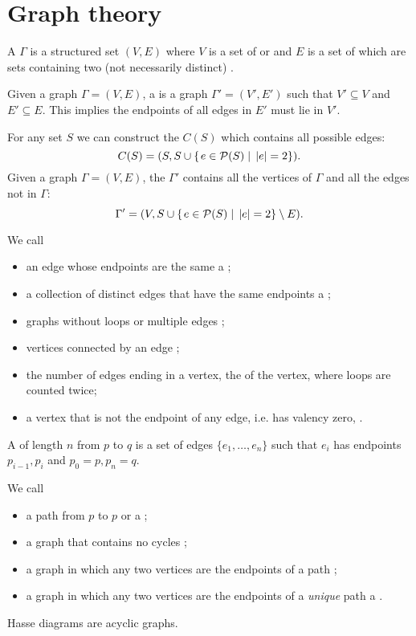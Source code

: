 \chapter{Graph theory}

\begin{definition}
A  $\Gamma$ is a structured set $(V,E)$ where $V$ is a set of  or  and $E$ is a set of  which are sets containing two (not necessarily distinct) .

Given a graph $\Gamma = (V,E)$, a  is a graph $\Gamma' = (V', E')$ such that $V'\subseteq V$ and $E'\subseteq E$. This implies the endpoints of all edges in $E'$ must lie in $V'$.

For any set $S$ we can construct the  $C(S)$ which contains all possible edges:
\[C(S) = (S, S\cup\left\{\left. e\in\mathcal{P}(S) \;\right|\; |e|=2 \right\}).\]
Given a graph $\Gamma = (V,E)$, the  $\Gamma'$ contains all the vertices of $\Gamma$ and all the edges not in $\Gamma$:
\[ \Gamma' = (V, S\cup\left\{\left. e\in\mathcal{P}(S) \;\right|\; |e|=2 \right\} \setminus E). \]

We call
\begin{itemize}
\item an edge whose endpoints are the same a ;
\item a collection of distinct edges that have the same endpoints a ;
\item graphs without loops or multiple edges ;
\item vertices connected by an edge ;
\item the number of edges ending in a vertex, the  of the vertex, where loops are counted twice;
\item a vertex that is not the endpoint of any edge, i.e. has valency zero, .
\end{itemize}

A  of length $n$ from  $p$ to $q$ is a set of edges $\{e_1, \ldots, e_n\}$ such that $e_i$ has endpoints $p_{i-1}, p_i$ and $p_0 =p, p_n = q$.

We call
\begin{itemize}
\item a path from $p$ to $p$  or a ;
\item a graph that contains no cycles ;
\item a graph in which any two vertices are the endpoints of a path ;
\item a graph in which any two vertices are the endpoints of a \emph{unique} path a .
\end{itemize}
\end{definition}
\begin{example}
Hasse diagrams are acyclic graphs.
\end{example}


